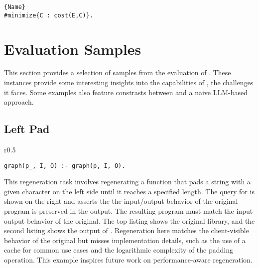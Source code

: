\begin{lstlisting}[caption={An optimization directive.}, label=lst:optimization]{Name}
#minimize{C : cost(E,C)}.
\end{lstlisting}


\chapter{Evaluation Samples}
This section provides a selection of samples from the evaluation of \sys.
These instances provide some interesting insights into the capabilities of \sys, the challenges it faces.
Some examples also feature constrasts between \sys and a naive LLM-based approach.

\section{Left Pad}
\begin{wrapfigure}[2]{r}{0.5\textwidth}
\begin{verbatim}
graph(p_, I, O) :- graph(p, I, O).
\end{verbatim}
\end{wrapfigure}
This regeneration task involves regenerating a
function that pads a string with a given character on the left side until it
reaches a specified length.
The query for \sys is shown on the right and asserts the the input/output behavior of the
original program is preserved in the output.
The resulting program must match the input-output behavior of the original.
The top listing shows the original  library, and the second listing shows the output
of \sys.
Regeneration here matches the client-visible behavior of the original but misses
implementation details, such as the use of a cache for common
use cases and the logarithmic complexity of the padding operation.
This example inspires future work on performance-aware regeneration.

